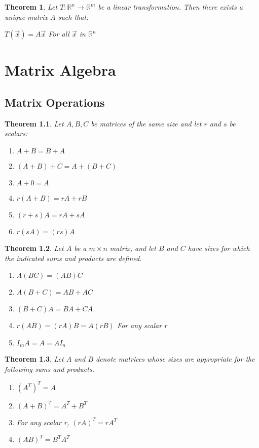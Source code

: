 \documentclass[oneside]{report}
\newtheorem{theorem}{Theorem}[section]
\begin{document}
\begin{theorem}
  Let $T:\mathbb{R}^n \rightarrow \mathbb{R}^m$ be a linear transformation. Then there exists a unique matrix
$A$ such that:
\begin{center}
  $T(\vec{x})=A\vec{x}$ For all $\vec{x}$ in $\mathbb{R}^n$
\end{center}
\end{theorem}

\chapter{Matrix Algebra}

\section{Matrix Operations}
\begin{theorem}
  Let $A,B,C$ be matrices of the same size and let $r$ and $s$ be scalars:
  \begin{enumerate}
    \item $A + B = B + A$
    \item $(A + B) + C = A + (B + C)$
    \item $A + 0 = A$
    \item $r(A + B) = rA + rB$
    \item $(r + s)A = rA + sA$
    \item $r(sA) = (rs)A$
  \end{enumerate}
\end{theorem}

\begin{theorem}
Let $A$ be a $m \times n$ matrix, and let $B$ and $C$ have sizes for which the indicated
sums and products are defined.
  \begin{enumerate}
    \item $A(BC) = (AB)C$
    \item $A(B + C) = AB + AC$
    \item $(B + C)A = BA + CA$
    \item $r(AB) = (rA)B = A(rB)$\newline
    For any scalar $r$
    \item $I_m A = A = A I_n$
  \end{enumerate}
\end{theorem}


\begin{theorem}
  Let $A$ and $B$ denote matrices whose sizes are appropriate for the following sums
  and products.
  \begin{enumerate}
    \item $(A^T)^T = A$
    \item $(A + B)^T = A^T + B^T$
    \item For any scalar r, \newline
    $(rA)^T = rA^T$
    \item $(AB)^T = B^TA^T$
  \end{enumerate}
\end{theorem}
\end{document}
